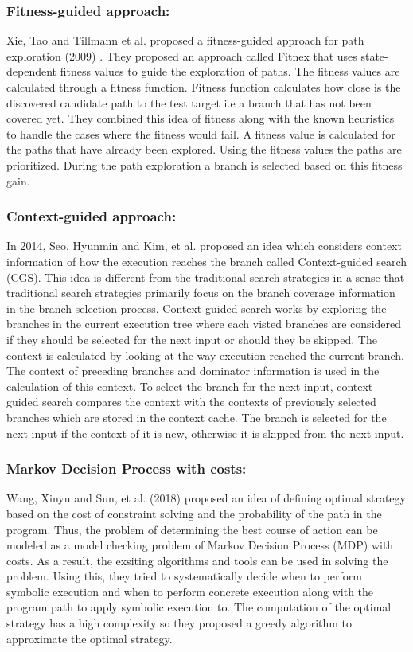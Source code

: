 \documentclass[	runningheads,
				a4paper]{llncs}
\begin{document}
\subsubsection{Fitness-guided approach:}
Xie, Tao and Tillmann et al. proposed a fitness-guided approach for path exploration (2009) \cite{xie2009fitness}. They proposed an approach called Fitnex that uses state-dependent fitness values to guide the exploration of paths. The fitness values are calculated through a fitness function. Fitness function calculates how close is the discovered candidate path to the test target i.e a branch that has not been covered yet. They combined this idea of fitness along with the known heuristics to handle the cases where the fitness would fail. A fitness value is calculated for the paths that have already been explored. Using the fitness values the paths are prioritized. During the path exploration a branch is selected based on this fitness gain. 

\subsubsection{Context-guided approach:}
In 2014, Seo, Hyunmin and Kim, et al. proposed an idea \cite{seo2014we} which considers context information of how the execution reaches the branch called Context-guided search (CGS). This idea is different from the traditional search strategies in a sense that traditional search strategies primarily focus on the branch coverage information in the branch selection process. Context-guided search works by exploring the branches in the current execution tree where each visted branches are considered if they should be selected for the next input or should they be skipped. The context is calculated by looking at the way execution reached the current branch. The context of preceding branches and dominator information is used in the calculation of this context. To select the branch for the next input, context-guided search compares the context with the contexts of previously selected branches which are stored in the context cache. The branch is selected for the next input if the context of it is new, otherwise it is skipped from the next input.

\subsubsection{Markov Decision Process with costs:}
Wang, Xinyu and Sun, et al. (2018) proposed an idea \cite{wang2018towards}  of defining optimal strategy based on the cost of constraint solving and the probability of the path in the program. Thus, the problem of determining the best course of action can be modeled as a model checking problem of Markov Decision Process (MDP) with costs. As a result, the exsiting algorithms and tools can be used in solving the problem. Using this, they tried to  systematically decide when to perform symbolic execution and when to perform concrete execution along with the program path to apply symbolic execution to. 
The computation of the optimal strategy has a high complexity so they proposed a greedy algorithm to approximate the optimal strategy.
\end{document}
